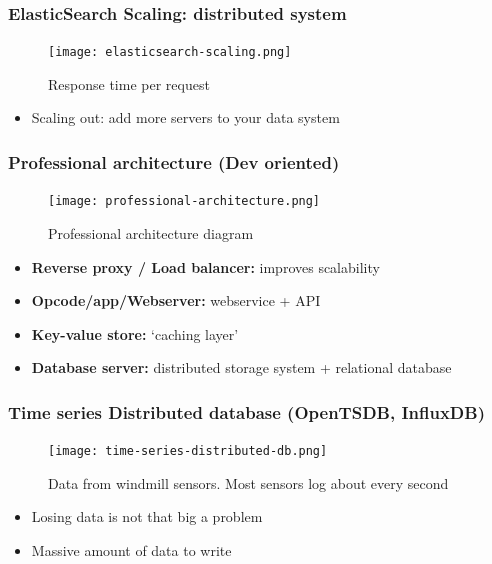 \documentclass{article}
\begin{document}
\subsubsection{ElasticSearch Scaling: distributed system}

\begin{figure}[H]
    \centering
    \texttt{[image: elasticsearch-scaling.png]}
    \caption{Response time per request}
\end{figure}

\begin{itemize}
    \item Scaling out: add more servers to your data system
\end{itemize}

\subsubsection{Professional architecture (Dev oriented)}

\begin{figure}[H]
    \centering
    \texttt{[image: professional-architecture.png]}
    \caption{Professional architecture diagram}
\end{figure}


\begin{itemize}
    \item \textbf{Reverse proxy / Load balancer:} improves scalability
    \item \textbf{Opcode/app/Webserver:} webservice + API
    \item \textbf{Key-value store:} `caching layer'
    \item \textbf{Database server:} distributed storage system + relational database
\end{itemize}

\subsubsection{Time series Distributed database (OpenTSDB, InfluxDB)}

\begin{figure}[H]
    \centering
    \texttt{[image: time-series-distributed-db.png]}
    \caption{Data from windmill sensors. Most sensors log about every second}
\end{figure}

\begin{itemize}
    \item Losing data is not that big a problem
    \item Massive amount of data to write 
\end{itemize}
\end{document}
